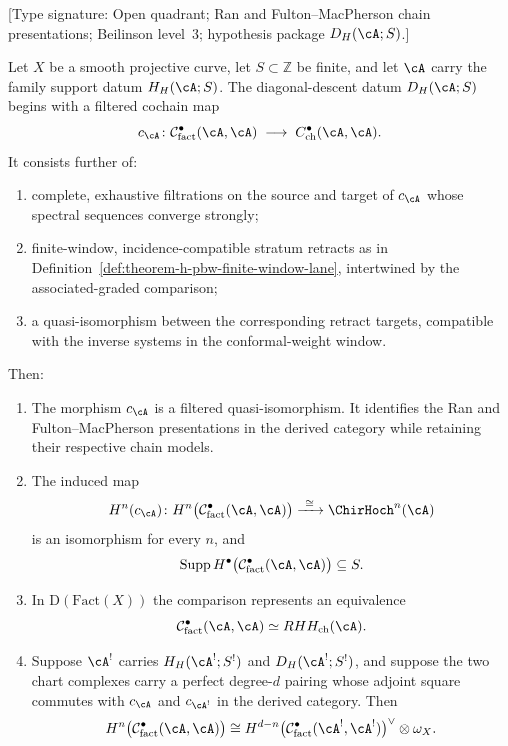 \begin{theorem}
\label{thm:bd-fact-vs-chirhoch}
\textup{[Type signature: Open quadrant; Ran and
Fulton--MacPherson chain presentations; Beilinson level~$3$;
hypothesis package $D_H(\cA;S)$.]}

Let $X$ be a smooth projective curve, let $S\subset\mathbb Z$ be
finite, and let $\cA$ carry the family support datum $H_H(\cA;S)$.
The diagonal-descent datum $D_H(\cA;S)$ begins with a filtered cochain
map
\begin{equation}\label{eq:bd-chirhoch-comparison}
c_{\cA}\colon
\mathcal{C}^\bullet_{\mathrm{fact}}(\cA,\cA)
\;\longrightarrow\;
 C^\bullet_{\mathrm{ch}}(\cA,\cA).
\end{equation}
It consists further of:
\begin{enumerate}[label=\textup{(D\arabic*)}]
\item complete, exhaustive filtrations on the source and target of
$c_\cA$ whose spectral sequences converge strongly;
\item finite-window, incidence-compatible stratum retracts as in
Definition~\ref{def:theorem-h-pbw-finite-window-lane}, intertwined by
the associated-graded comparison;
\item a quasi-isomorphism between the corresponding retract targets,
compatible with the inverse systems in the conformal-weight window.
\end{enumerate}
Then:
\begin{enumerate}[label=\textup{(\alph*)}]
\item The morphism $c_\cA$ is a filtered quasi-isomorphism.  It
identifies the Ran and Fulton--MacPherson presentations in the derived
category while retaining their respective chain models.
\item The induced map
\[
 H^n(c_{\cA})\colon
 H^n\bigl(\mathcal C^\bullet_{\mathrm{fact}}(\cA,\cA)\bigr)
 \xrightarrow{\ \cong\ }
 \ChirHoch^n(\cA)
\]
is an isomorphism for every $n$, and
\[
 \operatorname{Supp}
 H^\bullet\bigl(\mathcal C^\bullet_{\mathrm{fact}}(\cA,\cA)\bigr)
 \subseteq S.
\]
\item In $\mathrm D(\mathrm{Fact}(X))$ the comparison represents an
equivalence
\[
 \mathcal C^\bullet_{\mathrm{fact}}(\cA,\cA)
 \simeq RHH_{\mathrm{ch}}(\cA).
\]
\item Suppose $\cA^!$ carries $H_H(\cA^!;S^!)$ and
$D_H(\cA^!;S^!)$, and suppose the two chart complexes carry a perfect
degree-$d$ pairing whose adjoint square commutes with $c_\cA$ and
$c_{\cA^!}$ in the derived category.  Then
\[
 H^n\bigl(\mathcal C^\bullet_{\mathrm{fact}}(\cA,\cA)\bigr)
 \cong
 H^{d-n}\bigl(\mathcal C^\bullet_{\mathrm{fact}}(\cA^!,\cA^!)\bigr)^\vee
 \otimes\omega_X.
\]
\end{enumerate}
\end{theorem}

